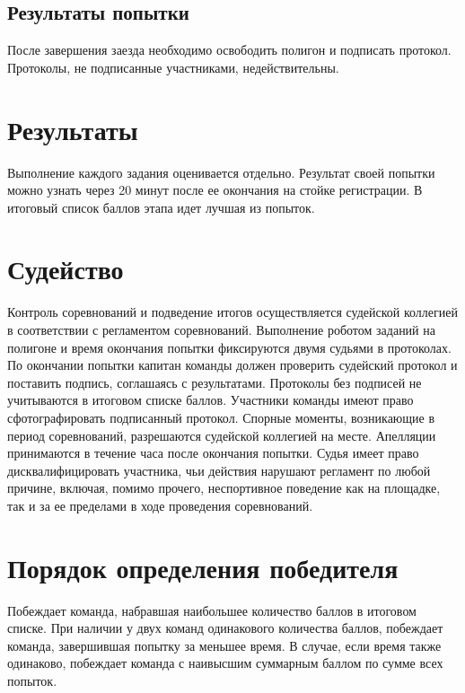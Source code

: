 \documentclass[12pt]{article}
\begin{document}
\subsection{Результаты попытки} \hspace*{1cm}
После завершения заезда необходимо освободить полигон и подписать протокол.  Протоколы, не подписанные участниками, недействительны.

\section{Результаты} \hspace*{1cm}
Выполнение каждого задания оценивается отдельно. Результат своей попытки можно узнать через 20 минут после ее окончания на стойке регистрации. В итоговый список баллов этапа идет лучшая из попыток.

\section{Судейство} \hspace*{1cm}
Контроль соревнований и подведение итогов осуществляется судейской коллегией в соответствии с регламентом соревнований.
Выполнение роботом заданий на полигоне и время окончания попытки фиксируются двумя судьями в протоколах. По окончании попытки капитан команды должен проверить судейский протокол и поставить подпись, соглашаясь с результатами. Протоколы без подписей не учитываются в итоговом списке баллов. Участники команды имеют право сфотографировать подписанный протокол.
Спорные моменты, возникающие в период соревнований, разрешаются судейской коллегией на месте. Апелляции принимаются в течение часа после окончания попытки.
Судья имеет право дисквалифицировать участника, чьи действия нарушают регламент по любой причине, включая, помимо прочего, неспортивное поведение как на площадке, так и за ее пределами в ходе проведения соревнований.

\section{Порядок определения победителя} \hspace*{1cm}
Побеждает команда, набравшая наибольшее количество баллов в итоговом списке. При наличии у двух команд одинакового количества баллов, побеждает команда, завершившая попытку за меньшее время. В случае, если время также одинаково, побеждает команда с наивысшим суммарным баллом по сумме всех попыток.
\end{document}

